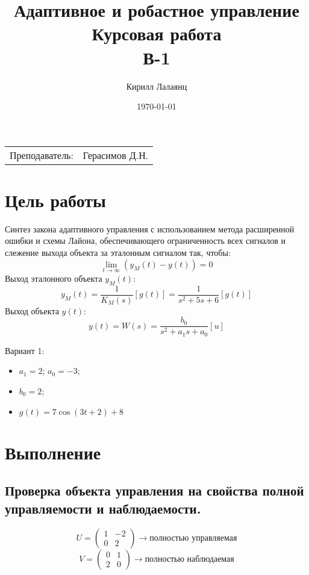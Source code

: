 \documentclass{article}
\title{Адаптивное и робастное управление \\ Курсовая работа\\ В-1} %
\author{Кирилл Лалаянц} %
\date{\today} %
\begin{document}
\maketitle %

\begin{center}
\begin{tabular}{l r}
Преподаватель: & Герасимов Д.Н. %
\end{tabular}
\end{center}
\newpage

\section{Цель работы}

Синтез закона адаптивного управления с использованием метода расширенной ошибки и схемы Лайона, обеспечивающего
ограниченность всех сигналов и слежение выхода объекта за эталонным
сигналом так, чтобы:
\[\lim_{t \rightarrow \infty}(y_M(t) - y(t)) = 0\]
Выход эталонного объекта \(y_M(t)\):
\[y_M(t) = \frac{1}{K_M(s)}[g(t)]=  \frac{1}{s^2 + 5s + 6}[g(t)]\]
Выход объекта \(y(t)\):
\[y(t) = W(s) = \frac{b_0}{s^2 + a_1 s + a_0}[u]\]

Вариант 1: 
\begin{itemize}
  \item \(a_1 = 2\); \(a_0 = -3\);
  \item \(b_0 = 2\);
  \item \(g(t) = 7 \cos(3t + 2) + 8\)
\end{itemize}


\section{Выполнение}
\subsection{Проверка объекта управления на свойства полной управляемости и наблюдаемости.}
\[U = \begin{pmatrix}
  1 & -2 \\
  0 & 2
\end{pmatrix} \rightarrow \text{полностью управляемая}\]
\[V = \begin{pmatrix}
  0 & 1 \\
  2 & 0
\end{pmatrix} \rightarrow \text{полностью наблюдаемая}\]
\end{document}
